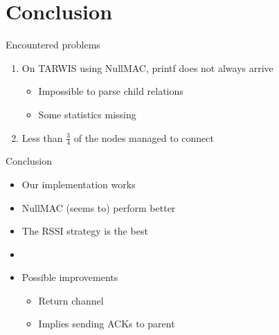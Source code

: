 \documentclass[14pt,aspectratio=169,xcolor={usenames,dvipsnames}]{beamer}
\begin{document}
\section{Conclusion}

\begin{frame}{Encountered problems}
\begin{enumerate}
\item On TARWIS using NullMAC, \textsf{printf} does not always arrive
\begin{itemize}
\item Impossible to parse child relations
\item Some statistics missing
\end{itemize}
\item Less than $\frac{3}{4}$ of the nodes managed to connect
\end{enumerate}
\end{frame}

\begin{frame}{Conclusion}
\begin{itemize}
\item Our implementation works
\item NullMAC (seems to) perform better
\item The RSSI strategy is the best
\item[]
\item Possible improvements
\begin{itemize}
\item Return channel
\item Implies sending ACKs to parent
\end{itemize}
\end{itemize}
\end{frame}
\end{document}
